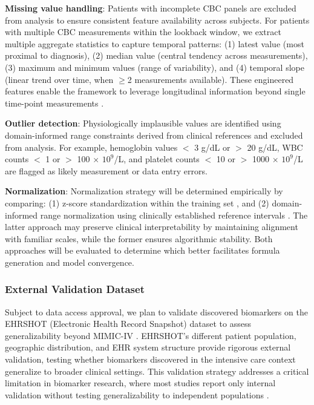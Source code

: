 \documentclass[12pt,a4paper]{article}
\begin{document}
\textbf{Missing value handling}: Patients with incomplete CBC panels are excluded from analysis to ensure consistent feature availability across subjects. For patients with multiple CBC measurements within the lookback window, we extract multiple aggregate statistics to capture temporal patterns: (1) latest value (most proximal to diagnosis), (2) median value (central tendency across measurements), (3) maximum and minimum values (range of variability), and (4) temporal slope (linear trend over time, when $\geq$2 measurements available). These engineered features enable the framework to leverage longitudinal information beyond single time-point measurements \cite{ref6}.

\textbf{Outlier detection}: Physiologically implausible values are identified using domain-informed range constraints derived from clinical references \cite{ref9} and excluded from analysis. For example, hemoglobin values $<$ 3 g/dL or $>$ 20 g/dL, WBC counts $<$ 1 or $>$ 100 $\times$ $10^9$/L, and platelet counts $<$ 10 or $>$ 1000 $\times$ $10^9$/L are flagged as likely measurement or data entry errors.

\textbf{Normalization}: Normalization strategy will be determined empirically by comparing: (1) z-score standardization within the training set \cite{ref21,ref22}, and (2) domain-informed range normalization using clinically established reference intervals \cite{ref9,ref10}. The latter approach may preserve clinical interpretability by maintaining alignment with familiar scales, while the former ensures algorithmic stability. Both approaches will be evaluated to determine which better facilitates formula generation and model convergence.

\subsubsection{External Validation Dataset}

Subject to data access approval, we plan to validate discovered biomarkers on the EHRSHOT (Electronic Health Record Snapshot) dataset to assess generalizability beyond MIMIC-IV \cite{ref11}. EHRSHOT's different patient population, geographic distribution, and EHR system structure provide rigorous external validation, testing whether biomarkers discovered in the intensive care context generalize to broader clinical settings. This validation strategy addresses a critical limitation in biomarker research, where most studies report only internal validation without testing generalizability to independent populations \cite{ref21,ref23}.
\end{document}
